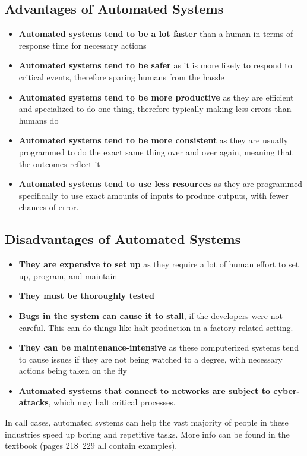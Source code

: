 \documentclass[../main.tex]{subfiles}
\begin{document}
\subsection{Advantages of Automated Systems}
\begin{itemize}
    \item \textbf{Automated systems tend to be a lot faster} than a human in terms of response time for necessary actions
    \item \textbf{Automated systems tend to be safer} as it is more likely to respond to critical events, therefore sparing humans from the hassle
    \item \textbf{Automated systems tend to be more productive} as they are efficient and specialized to do one thing, therefore typically making less errors than humans do
    \item \textbf{Automated systems tend to be more consistent} as they are usually programmed to do the exact same thing over and over again, meaning that the outcomes reflect it
    \item \textbf{Automated systems tend to use less resources} as they are programmed specifically to use exact amounts of inputs to produce outputs, with fewer chances of error.
\end{itemize}

\subsection{Disadvantages of Automated Systems}
\begin{itemize}
    \item \textbf{They are expensive to set up} as they require a lot of human effort to set up, program, and maintain
    \item \textbf{They must be thoroughly tested}
    \item \textbf{Bugs in the system can cause it to stall}, if the developers were not careful. This can do things like halt production in a factory-related setting. 
    \item \textbf{They can be maintenance-intensive} as these computerized systems tend to cause issues if they are not being watched to a degree, with necessary actions being taken on the fly
    \item \textbf{Automated systems that connect to networks are subject to cyber-attacks}, which may halt critical processes.
\end{itemize}

In call cases, automated systems can help the vast majority of people in these industries speed up boring and repetitive tasks. More info can be found in the textbook (pages 218~229 all contain examples).
\end{document}
